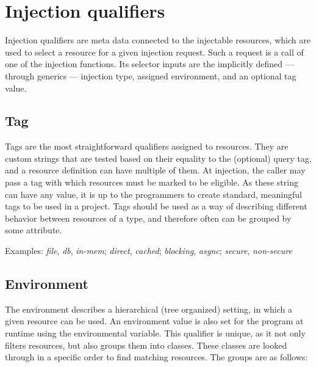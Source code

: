 	\section{Injection qualifiers}
	
		Injection qualifiers are meta data connected to the injectable resources, which are used to select a resource for a given injection request. Such a request is a call of one of the injection functions. Its selector inputs are the implicitly defined --- through generics --- injection type, assigned environment, and an optional tag value.
	
		\subsection*{Tag}
	
		Tags are the most straightforward qualifiers assigned to resources. They are custom strings that are tested based on their equality to the (optional) query tag, and a resource definition can have multiple of them. At injection, the caller may pass a tag with which resources must be marked to be eligible. As these string can have any value, it is up to the programmers to create standard, meaningful tags to be used in a project. Tags should be used as a way of describing different behavior between resources of a type, and therefore often can be grouped by some attribute.
		
		Examples: \emph{file}, \emph{db}, \emph{in-mem};
		\emph{direct}, \emph{cached};
		\emph{blocking}, \emph{async};
		\emph{secure}, \emph{non-secure}
	
		\subsection*{Environment}

		The environment describes a hierarchical (tree organized) setting, in which a given resource can be used. An environment value is also set for the program at runtime using the  environmental variable. This qualifier is unique, as it not only filters resources, but also groups them into classes. These classes are looked through in a specific order to find matching resources. The groups are as follows:
		
